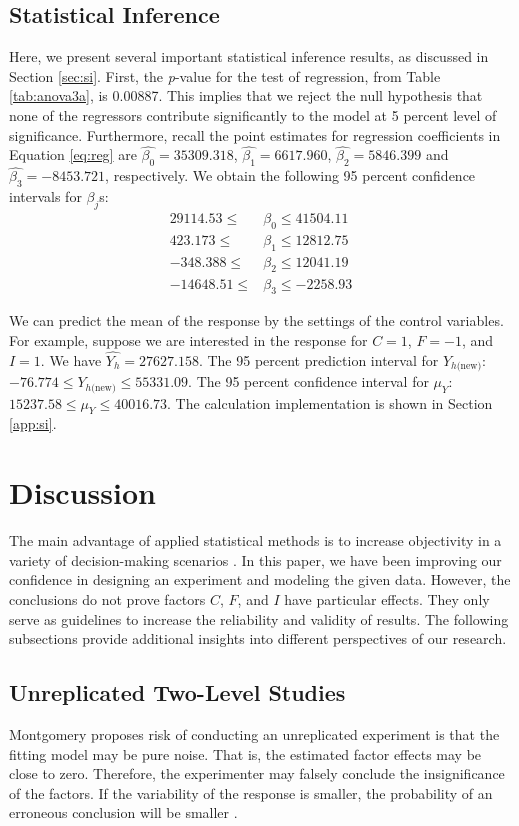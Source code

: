 \documentclass[11pt]{article}
\begin{document}
\subsection{Statistical Inference}
Here, we present several important statistical inference results, as discussed in Section \ref{sec:si}. First, the \textit{p}-value for the test of regression, from Table \ref{tab:anova3a}, is 0.00887. This implies that we reject the null hypothesis that none of the regressors contribute significantly to the model at 5 percent level of significance. Furthermore, recall the point estimates for regression coefficients in Equation \ref{eq:reg} are $\hat{\beta_0}=35309.318$, $\hat{\beta_1}=6617.960$, $\hat{\beta_2}=5846.399$ and $\hat{\beta_3}=-8453.721$, respectively. We obtain the following 95 percent confidence intervals for $\beta_j$s:
\begin{align*}
29114.53 \leq & \beta_0 \leq 41504.11 \\
423.173 \leq & \beta_1 \leq 12812.75 \\
-348.388 \leq & \beta_2 \leq 12041.19 \\
-14648.51 \leq & \beta_3 \leq -2258.93
\end{align*}
 
We can predict the mean of the response by the settings of the control variables. For example, suppose we are interested in the response for $C=1$, $F=-1$, and $I=1$. We have $\hat{Y_h}=27627.158$. The 95 percent prediction interval for $Y_{h\text{(new)}}$: $-76.774 \leq Y_{h\text{(new)}} \leq 55331.09$. The 95 percent confidence interval for $\mu_{Y}$: $15237.58 \leq \mu_{Y} \leq 40016.73$. The calculation implementation is shown in Section \ref{app:si}.

\section{Discussion}\label{sec:discussion}
The main advantage of applied statistical methods is to increase objectivity in a variety of decision-making scenarios \cite{bk:dae2}. In this paper, we have been improving our confidence in designing an experiment and modeling the given data. However, the conclusions do not prove factors $C$, $F$, and $I$ have particular effects. They only serve as guidelines to increase the reliability and validity of results. The following subsections provide additional insights into different perspectives of our research.

\subsection{Unreplicated Two-Level Studies}\label{sec:rep}
Montgomery \cite{bk:dae2} proposes risk of conducting an unreplicated experiment is that the fitting model may be pure noise. That is, the estimated factor effects may be close to zero. Therefore, the experimenter may falsely conclude the insignificance of the factors. If the variability of the response is smaller, the probability of an erroneous conclusion will be smaller \cite{bk:dae2}.
\end{document}
